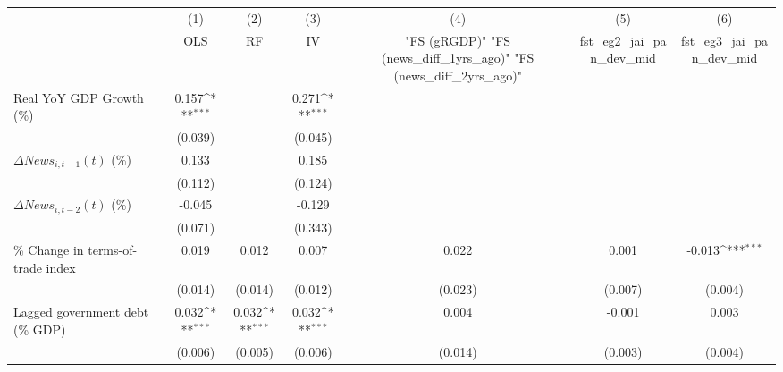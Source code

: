 {
\def\sym#1{\ifmmode^{#1}\else\(^{#1}\)\fi}
\begin{tabular}{l*{6}{c}}
\toprule
                    &\multicolumn{1}{c}{(1)}&\multicolumn{1}{c}{(2)}&\multicolumn{1}{c}{(3)}&\multicolumn{1}{c}{(4)}&\multicolumn{1}{c}{(5)}&\multicolumn{1}{c}{(6)}\\
                    &\multicolumn{1}{c}{OLS}&\multicolumn{1}{c}{RF}&\multicolumn{1}{c}{IV}&\multicolumn{1}{c}{ "FS (gRGDP)"  "FS (news_diff_1yrs_ago)"  "FS (news_diff_2yrs_ago)" }&\multicolumn{1}{c}{fst_eg2_jai_pan_dev_mid}&\multicolumn{1}{c}{fst_eg3_jai_pan_dev_mid}\\
\midrule
Real YoY GDP Growth (\%)&       0.157\sym{***}&                     &       0.271\sym{***}&                     &                     &                     \\
                    &     (0.039)         &                     &     (0.045)         &                     &                     &                     \\
\addlinespace
$ \Delta News_{i,t-1}(t)$ (\%)&       0.133         &                     &       0.185         &                     &                     &                     \\
                    &     (0.112)         &                     &     (0.124)         &                     &                     &                     \\
\addlinespace
$ \Delta News_{i,t-2}(t)$ (\%)&      -0.045         &                     &      -0.129         &                     &                     &                     \\
                    &     (0.071)         &                     &     (0.343)         &                     &                     &                     \\
\addlinespace
\% Change in terms-of-trade index&       0.019         &       0.012         &       0.007         &       0.022         &       0.001         &      -0.013\sym{***}\\
                    &     (0.014)         &     (0.014)         &     (0.012)         &     (0.023)         &     (0.007)         &     (0.004)         \\
\addlinespace
Lagged government debt (\% GDP)&       0.032\sym{***}&       0.032\sym{***}&       0.032\sym{***}&       0.004         &      -0.001         &       0.003         \\
                    &     (0.006)         &     (0.005)         &     (0.006)         &     (0.014)         &     (0.003)         &     (0.004)         \\

\end{tabular}}

